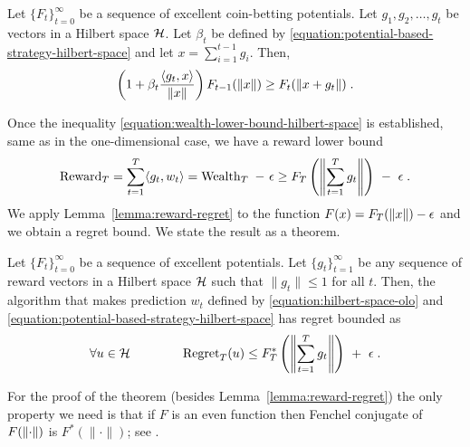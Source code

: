 \begin{lemma}
\label{lemma:recursion_hilbert}
Let $\{F_t\}_{t=0}^\infty$ be a sequence of excellent coin-betting potentials.
Let $g_1, g_2, \dots, g_t$ be vectors in a Hilbert space $\mathcal{H}$. Let $\beta_t$
be defined by \eqref{equation:potential-based-strategy-hilbert-space}
and let $x = \sum_{i=1}^{t-1} g_i$. Then,
$$
\left(1 + \beta_t \frac{\langle g_t, x \rangle}{\|x\|} \right) F_{t-1}(\left\|{x}\right\|)
\ge F_t(\left\|{x + g_t}\right\|) \; .
$$
\end{lemma}

Once the inequality \eqref{equation:wealth-lower-bound-hilbert-space} is
established, same as in the one-dimensional case, we have a reward lower bound
\begin{equation}
\label{equation:hilbert-space-olo-reward-lower-bound}
\operatorname{Reward}_T
= \sum_{t=1}^T \langle g_t, w_t \rangle
= \operatorname{Wealth}_T \ - \ \epsilon
\ge F_T\left(\left\|{\sum_{t=1}^T g_t}\right\| \right) \ - \ \epsilon \; .
\end{equation}
We apply Lemma~\ref{lemma:reward-regret} to the function $F(x) = F_T(\left\|{x}\right\|) -
\epsilon$ and we obtain a regret bound. We state the result as a theorem.

\begin{theorem}
\label{theorem:hilbert-space-olo-regret-bound}
Let $\{F_t\}_{t=0}^\infty$ be a sequence of excellent potentials. Let
$\{g_t\}_{t=1}^\infty$ be any sequence of reward vectors in a Hilbert space $\mathcal{H}$
such that $\|g_t\| \le 1$ for all $t$. Then, the algorithm that makes prediction
$w_t$ defined by \eqref{equation:hilbert-space-olo} and
\eqref{equation:potential-based-strategy-hilbert-space} has regret bounded as
$$
\forall u \in \H \qquad \qquad
\Regret_T(u) \le F_T^*\left(\norm{\sum_{t=1}^T g_t} \right) \ + \ \epsilon \; .
$$
\end{theorem}

For the proof of the theorem (besides Lemma~\ref{lemma:reward-regret}) the only
property we need is that if $F$ is an even function then Fenchel conjugate of
$F(\left\|{\cdot}\right\|)$ is $F^*(\|\cdot\|)$; see \citet[Example 13.7]{BauschkeC2011}.
